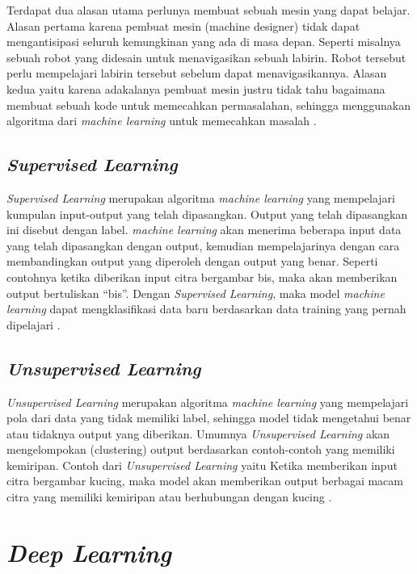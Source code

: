 Terdapat dua alasan utama perlunya membuat sebuah mesin yang dapat belajar. Alasan pertama karena pembuat mesin 
(machine designer) tidak dapat mengantisipasi seluruh kemungkinan yang ada di masa depan. Seperti misalnya sebuah robot 
yang didesain untuk menavigasikan sebuah labirin. Robot tersebut perlu mempelajari labirin tersebut sebelum dapat menavigasikannya. 
Alasan kedua yaitu karena adakalanya pembuat mesin justru tidak tahu bagaimana membuat sebuah kode untuk memecahkan permasalahan, 
sehingga menggunakan algoritma dari \emph{machine learning} untuk memecahkan masalah \parencite{Russel2021}.

\subsection{\emph{Supervised Learning}}

\emph{Supervised Learning} merupakan algoritma \emph{machine learning} yang mempelajari kumpulan input-output yang telah dipasangkan. 
Output yang telah dipasangkan ini disebut dengan label. \emph{machine learning} akan menerima beberapa input data yang telah 
dipasangkan dengan output, kemudian mempelajarinya dengan cara membandingkan output yang diperoleh dengan output yang benar. Seperti 
contohnya ketika diberikan input citra bergambar bis, maka akan memberikan output bertuliskan “bis”. Dengan \emph{Supervised Learning}, 
maka model \emph{machine learning} dapat mengklasifikasi data baru berdasarkan data training yang pernah dipelajari \parencite{Russel2021}.

\subsection{\emph{Unsupervised Learning}}

\emph{Unsupervised Learning} merupakan algoritma \emph{machine learning} yang mempelajari pola dari data yang tidak memiliki label, 
sehingga model tidak mengetahui benar atau tidaknya output yang diberikan. Umumnya \emph{Unsupervised Learning} akan mengelompokan 
(clustering) output berdasarkan contoh-contoh yang memiliki kemiripan. Contoh dari \emph{Unsupervised Learning} yaitu Ketika memberikan 
input citra bergambar kucing, maka model akan memberikan output berbagai macam citra yang memiliki kemiripan atau berhubungan dengan 
kucing \parencite{Russel2021}.

\section{\emph{Deep Learning}}
\label{sec:deeplearning}

